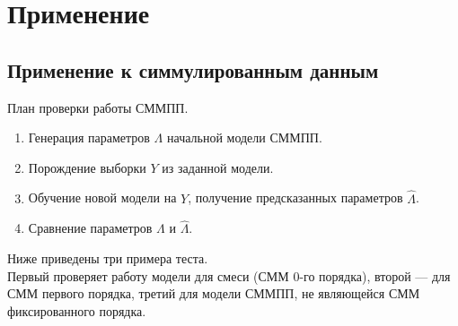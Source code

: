 \documentclass{matmex-diploma-custom}
\begin{document}
\section{Применение}
\subsection{Применение к симмулированным данным}
План проверки работы СММПП.
\begin{enumerate}

\item
Генерация параметров $ \Lambda $ начальной модели СММПП.
\item
Порождение выборки $ Y $ из заданной модели.
\item
Обучение новой модели на $ Y $, получение предсказанных параметров $\hat{\Lambda}$.
\item
Сравнение параметров $ \Lambda $ и $ \hat{\Lambda} $.
\end{enumerate}

Ниже приведены три примера теста.
\\Первый проверяет работу модели для смеси (СММ 0-го порядка), второй --- для СММ первого порядка, третий для модели СММПП, не являющейся СММ фиксированного порядка.
\end{document}
